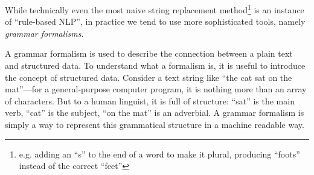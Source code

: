 While technically even the most naive string replacement method\footnote{e.g. adding an ``s'' to the end of a word to make it plural, producing ``foots'' instead of the correct ``feet''} is an instance of ``rule-based NLP'', in practice we tend to use more sophisticated tools, namely \emph{grammar formalisms}.

% 
%
%
%
%

A grammar formalism is used to describe the connection between a plain text and structured data. To understand what a formalism is, it is useful to introduce the concept of structured data. Consider a text string like ``the cat sat on the mat''—for a general-purpose computer program, it is nothing more than an array of characters. But to a human linguist, it is full of structure: ``sat'' is the main verb, ``cat'' is the subject, ``on the mat'' is an adverbial. A grammar formalism is simply a way to represent this grammatical structure in a machine readable way.




